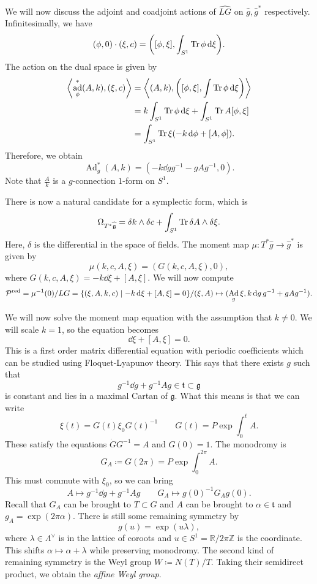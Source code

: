 \documentclass[leqno, openany]{memoir}
\theoremstyle{definition}
\theoremstyle{remark}
\theoremstyle{plain}
\theoremstyle{definition}
\theoremstyle{remark}
\newcommand{\R}{\mathbb{R}}
\newcommand{\Z}{\mathbb{Z}}
\newcommand{\g}{\mathfrak{g}}
\newcommand{\mc}[1]{\mathcal{#1}}
\newcommand{\mf}[1]{\mathfrak{#1}}
\newcommand{\mr}[1]{\mathrm{#1}}
\newcommand{\wh}[1]{\widehat{#1}}
\DeclareMathOperator{\ad}{ad}
\DeclareMathOperator{\Ad}{Ad}
\begin{document}
We will now discuss the adjoint and coadjoint actions of $\wh{LG}$ on $\wh{g}, \wh{g}^*$ respectively. Infinitesimally, we have
\[ (\phi, 0) \cdot (\xi, c) = \qty([\phi, \xi], \int_{S^1} \Tr \phi \dd{\xi}). \]
The action on the dual space is given by
\begin{align*}
  \ev{\ad^*_{\phi}(A, k), (\xi, c)} &= \ev{(A,k), \qty([\phi, \xi], \int \Tr \phi \dd{\xi})} \\
                                    &= k\int_{S^1} \Tr \phi \dd{\xi} + \int_{S^1} \Tr A[\phi, \xi] \\
                                    &= \int_{S^1} \Tr \xi(-k \dd{\phi} + [A, \phi]).
\end{align*}
Therefore, we obtain
\[ \Ad^*_g(A, k) = (-k \dd{g} g^{-1} - g A g^{-1}, 0). \]
Note that $\frac{A}{k}$ is a $g$-connection $1$-form on $S^1$.

There is now a natural candidate for a symplectic form, which is
\[ \Omega_{T^* \wh{\g}} = \delta k \wedge \delta c + \int_{S^1} \Tr \delta A \wedge \delta \xi. \]
Here, $\delta$ is the differential in the space of fields. The moment map $\mu \colon T^* \wh{g} \to \wh{g}^*$ is given by
\[ \mu(k, c, A, \xi) = (G(k, c, A, \xi), 0), \]
where $G(k,c,A,\xi) = -k \dd{\xi} + [A, \xi]$. We will now compute
\[ \mc{P}^{\mr{red}} = \mu^{-1}(0) / LG = \qty{(\xi, A, k, c) \mid -k \dd{\xi} + [A,\xi] = 0}/(\xi, A) \mapsto (\Ad_g \xi, k \dd{g}g^{-1} + g A g^{-1}). \]

We will now solve the moment map equation with the assumption that $k \neq 0$. We will scale $k=1$, so the equation becomes
\[ \dd{\xi} + [A, \xi] = 0. \]
This is a first order matrix differential equation with periodic coefficients which can be studied using Floquet-Lyapunov theory. This says that there exists $g$ such that
\[ g^{-1} \dd{g} + g^{-1} A g \in \mf{t} \subset \g \]
is constant and lies in a maximal Cartan of $\g$. What this means is that we can write
\[ \xi(t) = G(t) \xi_0 G(t)^{-1} \qquad G(t) = P \exp \int_0^t A. \]
These satisfy the equations $\dot{G} G^{-1} = A$ and $G(0) = 1$. The monodromy is
\[ G_A \coloneqq G(2\pi) = P \exp \int_0^{2\pi} A. \]
This must commute with $\xi_0$, so we can bring
\[ A \mapsto g^{-1} \dd{g} + g^{-1}Ag \qquad G_A \mapsto g(0)^{-1} G_A g(0). \]
Recall that $G_A$ can be brought to $T \subset G$ and $A$ can be brought to $\alpha \in \mf{t}$ and $g_A = \exp(2\pi \alpha)$. There is still some remaining symmetry by
\[ g(u) = \exp(u\lambda), \]
where $\lambda \in \Lambda^{\vee}$ is in the lattice of coroots and $u \in S^1 = \R/2\pi \Z$ is the coordinate. This shifts $\alpha \mapsto \alpha + \lambda$ while preserving monodromy. The second kind of remaining symmetry is the Weyl group $W \coloneqq N(T)/T$. Taking their semidirect product, we obtain the \textit{affine Weyl group}.
\end{document}

